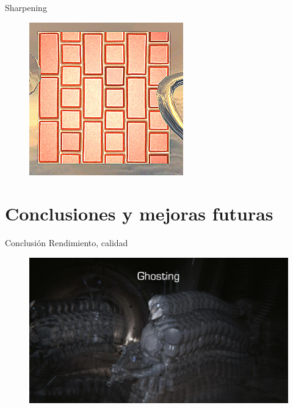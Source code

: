 \documentclass[table]{beamer}
\begin{document}
\begin{frame}[fragile]{Sharpening}
    \begin{figure}
        \includegraphics[width=\linewidth]{./figures/sharpONsmall.png}
    \end{figure}
\end{frame}

\section{Conclusiones y mejoras futuras}

\begin{frame}[fragile]{Conclusión}
    Rendimiento, calidad
    \begin{figure}
        \includegraphics[width=.8\linewidth]{./figures/ghosting.png}
    \end{figure}
\end{frame}
\end{document}
